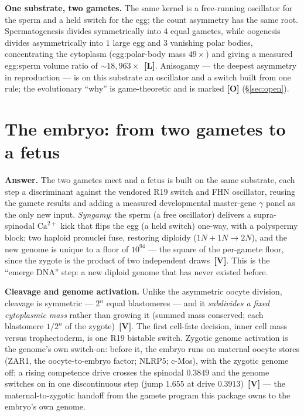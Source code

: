 \documentclass[11pt]{article}
\newcommand{\gradeV}{\textcolor{verified}{\textbf{[V]}}}
\newcommand{\gradeL}{\textcolor{verified}{\textbf{[L]}}}
\newcommand{\gradeO}{\textcolor{open}{\textbf{[O]}}}
\begin{document}
\textbf{One substrate, two gametes.} The same kernel is a free-running oscillator for the sperm and a held
switch for the egg; the count asymmetry has the same root. Spermatogenesis divides symmetrically into
$4$ equal gametes, while oogenesis divides
asymmetrically into $1$ large egg and
$3$ vanishing polar bodies, concentrating the cytoplasm
(egg:polar-body mass $49\times$) and giving a measured egg:sperm
volume ratio of $\sim18,963\times$~\gradeL{}. Anisogamy ---
the deepest asymmetry in reproduction --- is on this substrate an oscillator and a switch built from one rule;
the evolutionary ``why'' is game-theoretic and is marked \gradeO{} (\S\ref{sec:open}).

\section{The embryo: from two gametes to a fetus}

\textbf{Answer.} The two gametes meet and a fetus is built on the same substrate, each step a discriminant
against the vendored R19 switch and FHN oscillator, reusing the gamete results and adding a measured
developmental master-gene $\gamma$ panel as the only new input. \emph{Syngamy}: the sperm (a free
oscillator) delivers a supra-spinodal $\mathrm{Ca}^{2+}$ kick that flips the egg (a held switch) one-way,
with a polyspermy block; two haploid pronuclei fuse, restoring diploidy ($1N{+}1N\to 2N$), and the new
genome is unique to a floor of $10^{94}$ --- the
square of the per-gamete floor, since the zygote is the product of two independent draws~\gradeV{}. This is
the ``emerge DNA'' step: a new diploid genome that has never existed before.

\textbf{Cleavage and genome activation.} Unlike the asymmetric oocyte division, cleavage is symmetric ---
$2^{n}$ equal blastomeres --- and it \emph{subdivides a fixed cytoplasmic mass} rather than growing it (summed
mass conserved; each blastomere $1/2^{n}$ of the zygote)~\gradeV{}. The first cell-fate decision, inner cell
mass versus trophectoderm, is one R19 bistable switch. Zygotic genome activation is the genome's own
switch-on: before it, the embryo runs on maternal oocyte stores (ZAR1, the oocyte-to-embryo factor; NLRP5;
c-Mos), with the zygotic genome off; a rising competence drive crosses the spinodal
$0.3849$ and the genome switches on in one discontinuous step (jump
$1.655$ at drive $0.3913$)~\gradeV{} --- the
maternal-to-zygotic handoff from the gamete program this package owns to the embryo's own genome.
\end{document}
